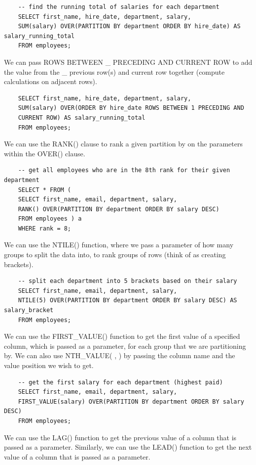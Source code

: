 \documentclass[11pt, a4paper]{article}
\begin{document}
\begin{spacing}{1.1}
\begin{lstlisting}
	-- find the running total of salaries for each department
	SELECT first_name, hire_date, department, salary,
	SUM(salary) OVER(PARTITION BY department ORDER BY hire_date) AS salary_running_total
	FROM employees;	\end{lstlisting} \vspace*{1mm}
	We can pass ROWS BETWEEN \_ PRECEDING AND CURRENT ROW to add the value from the \_ previous row(s) and current row together (compute calculations on adjacent rows). 
	\begin{lstlisting}
	SELECT first_name, hire_date, department, salary,
	SUM(salary) OVER(ORDER BY hire_date ROWS BETWEEN 1 PRECEDING AND 
	CURRENT ROW) AS salary_running_total
	FROM employees; \end{lstlisting} \vspace*{1mm}
	We can use the RANK() clause to rank a given partition by on the parameters within the OVER() clause.
	\begin{lstlisting}
	-- get all employees who are in the 8th rank for their given department
	SELECT * FROM (
	SELECT first_name, email, department, salary, 
	RANK() OVER(PARTITION BY department ORDER BY salary DESC)
	FROM employees ) a
	WHERE rank = 8; \end{lstlisting} \vspace*{1mm}
	We can use the NTILE() function, where we pass a parameter of how many groups to split the data into, to rank groups of rows (think of as creating brackets). 
	\begin{lstlisting}
	-- split each department into 5 brackets based on their salary
	SELECT first_name, email, department, salary, 
	NTILE(5) OVER(PARTITION BY department ORDER BY salary DESC) AS salary_bracket
	FROM employees;	\end{lstlisting} \vspace*{1mm}
	We can use the FIRST\_VALUE() function to get the first value of a specified column, which is passed as a parameter, for each group that we are partitioning by. We can also use NTH\_VALUE( , ) by passing the column name and the value position we wish to get.
	\begin{lstlisting}
	-- get the first salary for each department (highest paid)
	SELECT first_name, email, department, salary, 
	FIRST_VALUE(salary) OVER(PARTITION BY department ORDER BY salary DESC)
	FROM employees;	\end{lstlisting} \vspace*{1mm}
	We can use the LAG() function to get the previous value of a column that is passed as a parameter. Similarly, we can use the LEAD() function to get the next value of a column that is passed as a parameter.

\end{spacing}
\end{document}
